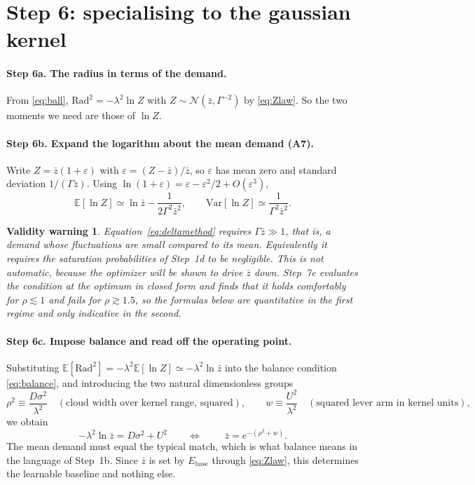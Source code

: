 \documentclass[11pt,a4paper]{article}
\newtheorem{warning}{Validity warning}
\newcommand{\EE}{\mathbb{E}}
\newcommand{\Var}{\mathrm{Var}}
\newcommand{\Ebase}{E_{\mathrm{base}}}
\begin{document}
\section{Step 6: specialising to the gaussian kernel}
\label{sec:gaussian}

\paragraph{Step 6a. The radius in terms of the demand.} From \eqref{eq:ball},
$\mathrm{Rad}^2=-\lambda^2\ln Z$ with $Z\sim\mathcal{N}(\bar z,\Gamma^{-2})$ by
\eqref{eq:Zlaw}. So the two moments we need are those of $\ln Z$.

\paragraph{Step 6b. Expand the logarithm about the mean demand (A7).} Write
$Z=\bar z(1+\varepsilon)$ with $\varepsilon=(Z-\bar z)/\bar z$, so $\varepsilon$ has mean
zero and standard deviation $1/(\Gamma\bar z)$. Using
$\ln(1+\varepsilon)=\varepsilon-\varepsilon^2/2+O(\varepsilon^3)$,
\begin{equation}
  \EE[\ln Z] \simeq \ln\bar z - \frac{1}{2\Gamma^2\bar z^2},
  \qquad
  \Var[\ln Z] \simeq \frac{1}{\Gamma^2\bar z^2}.
  \label{eq:deltamethod}
\end{equation}

\begin{warning}
\label{warn:delta}
Equation~\eqref{eq:deltamethod} requires $\Gamma\bar z \gg 1$, that is, a demand whose
fluctuations are small compared to its mean. Equivalently it requires the saturation
probabilities of Step~1d to be negligible. This is not automatic, because the optimizer
will be shown to drive $\bar z$ down. Step~7e evaluates the condition \emph{at the
optimum} in closed form and finds that it holds comfortably for $\rho\lesssim1$ and
fails for $\rho\gtrsim1.5$, so the formulas below are quantitative in the first regime
and only indicative in the second.
\end{warning}

\paragraph{Step 6c. Impose balance and read off the operating point.} Substituting
$\EE[\mathrm{Rad}^2]=-\lambda^2\EE[\ln Z]\simeq-\lambda^2\ln\bar z$ into the balance
condition \eqref{eq:balance}, and introducing the two natural dimensionless groups
\begin{equation}
  \rho^2 \equiv \frac{D\sigma^2}{\lambda^2}
   \quad(\text{cloud width over kernel range, squared}),
  \qquad
  w \equiv \frac{U^2}{\lambda^2}
   \quad(\text{squared lever arm in kernel units}),
\end{equation}
we obtain
\begin{equation}
  -\lambda^2\ln\bar z = D\sigma^2+U^2
  \qquad\Longleftrightarrow\qquad
  \boxed{\;\bar z = e^{-(\rho^2+w)} . }
  \label{eq:zbar}
\end{equation}
The mean demand must equal the typical match, which is what balance means in the
language of Step~1b. Since $\bar z$ is set by $\Ebase$ through \eqref{eq:Zlaw}, this
determines the learnable baseline and nothing else.
\end{document}
